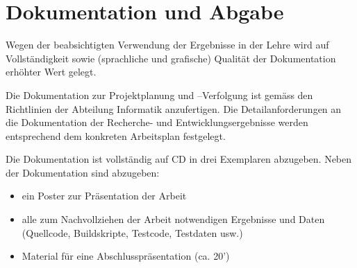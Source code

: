 \section*{Dokumentation und Abgabe}
Wegen der beabsichtigten Verwendung der Ergebnisse in der Lehre wird auf
Vollständigkeit sowie (sprachliche und grafische) Qualität der Dokumentation
erhöhter Wert gelegt.

Die Dokumentation zur Projektplanung und –Verfolgung ist gemäss den Richtlinien
der Abteilung Informatik anzufertigen. Die Detailanforderungen an die
Dokumentation der Recherche- und Entwicklungsergebnisse werden entsprechend dem
konkreten Arbeitsplan festgelegt.

Die Dokumentation ist vollständig auf CD in drei Exemplaren abzugeben.
Neben der Dokumentation sind abzugeben:

\begin{itemize}
    \item ein Poster zur Präsentation der Arbeit
    \item alle zum Nachvollziehen der Arbeit notwendigen Ergebnisse und Daten (Quellcode,
        Buildskripte, Testcode, Testdaten usw.)
    \item Material für eine Abschlusspräsentation (ca. 20’)
\end{itemize}

